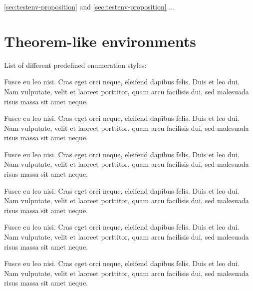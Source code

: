 \documentclass[a4paper,USenglish,cleveref,autoref,thm-restate]{lipics-v2019}
\begin{document}
\cref{sec:testenv-proposition} and \autoref{sec:testenv-proposition} ...

\section{Theorem-like environments}\label{sec:theorem-environments}

List of different predefined enumeration styles:

\begin{theorem}\label{sec:testenv-theorem}
Fusce eu leo nisi. Cras eget orci neque, eleifend dapibus felis. Duis et leo dui. Nam vulputate, velit et laoreet porttitor, quam arcu facilisis dui, sed malesuada risus massa sit amet neque.
\end{theorem}

\begin{lemma}\label{sec:testenv-lemma}
Fusce eu leo nisi. Cras eget orci neque, eleifend dapibus felis. Duis et leo dui. Nam vulputate, velit et laoreet porttitor, quam arcu facilisis dui, sed malesuada risus massa sit amet neque.
\end{lemma}

\begin{corollary}\label{sec:testenv-corollary}
Fusce eu leo nisi. Cras eget orci neque, eleifend dapibus felis. Duis et leo dui. Nam vulputate, velit et laoreet porttitor, quam arcu facilisis dui, sed malesuada risus massa sit amet neque.
\end{corollary}

\begin{proposition}\label{sec:testenv-proposition}
Fusce eu leo nisi. Cras eget orci neque, eleifend dapibus felis. Duis et leo dui. Nam vulputate, velit et laoreet porttitor, quam arcu facilisis dui, sed malesuada risus massa sit amet neque.
\end{proposition}

\begin{exercise}\label{sec:testenv-exercise}
Fusce eu leo nisi. Cras eget orci neque, eleifend dapibus felis. Duis et leo dui. Nam vulputate, velit et laoreet porttitor, quam arcu facilisis dui, sed malesuada risus massa sit amet neque.
\end{exercise}

\begin{definition}\label{sec:testenv-definition}
Fusce eu leo nisi. Cras eget orci neque, eleifend dapibus felis. Duis et leo dui. Nam vulputate, velit et laoreet porttitor, quam arcu facilisis dui, sed malesuada risus massa sit amet neque.
\end{definition}
\end{document}
